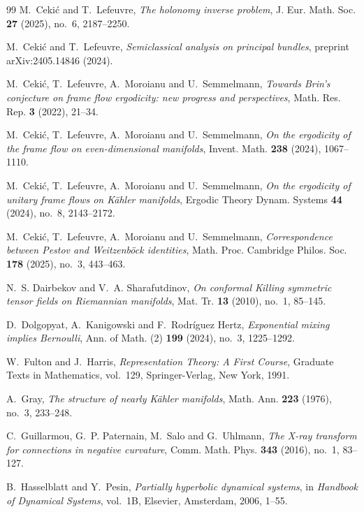 \documentclass[reqno,11pt]{amsart}
\theoremstyle{definition}
\begin{document}
\begin{thebibliography}{99}
M.~Ceki\'c and T.~Lefeuvre,
\emph{The holonomy inverse problem},
J. Eur. Math. Soc. \textbf{27} (2025), no.~6, 2187--2250.

M.~Ceki\'c and T.~Lefeuvre,
\emph{Semiclassical analysis on principal bundles},
preprint arXiv:2405.14846 (2024).

M.~Ceki\'c, T.~Lefeuvre, A.~Moroianu and U.~Semmelmann,
\emph{Towards Brin's conjecture on frame flow ergodicity: new progress and
perspectives},
Math. Res. Rep. \textbf{3} (2022), 21--34.

M.~Ceki\'c, T.~Lefeuvre, A.~Moroianu and U.~Semmelmann,
\emph{On the ergodicity of the frame flow on even-dimensional manifolds},
Invent. Math. \textbf{238} (2024), 1067--1110.

M.~Ceki\'c, T.~Lefeuvre, A.~Moroianu and U.~Semmelmann,
\emph{On the ergodicity of unitary frame flows on K\"ahler manifolds},
Ergodic Theory Dynam. Systems \textbf{44} (2024), no.~8, 2143--2172.

M.~Ceki\'c, T.~Lefeuvre, A.~Moroianu and U.~Semmelmann,
\emph{Correspondence between Pestov and Weitzenb\"ock identities},
Math. Proc. Cambridge Philos. Soc. \textbf{178} (2025), no.~3, 443--463.

N.~S. Dairbekov and V.~A. Sharafutdinov,
\emph{On conformal Killing symmetric tensor fields on Riemannian manifolds},
Mat. Tr. \textbf{13} (2010), no.~1, 85--145.

D.~Dolgopyat, A.~Kanigowski and F.~Rodr\'iguez Hertz,
\emph{Exponential mixing implies Bernoulli},
Ann. of Math. (2) \textbf{199} (2024), no.~3, 1225--1292.

W.~Fulton and J.~Harris,
\emph{Representation Theory: A First Course},
Graduate Texts in Mathematics, vol.~129, Springer-Verlag, New York, 1991.

A.~Gray,
\emph{The structure of nearly K\"ahler manifolds},
Math. Ann. \textbf{223} (1976), no.~3, 233--248.

C.~Guillarmou, G.~P. Paternain, M.~Salo and G.~Uhlmann,
\emph{The X-ray transform for connections in negative curvature},
Comm. Math. Phys. \textbf{343} (2016), no.~1, 83--127.

B.~Hasselblatt and Y.~Pesin,
\emph{Partially hyperbolic dynamical systems},
in \emph{Handbook of Dynamical Systems}, vol.~1B,
Elsevier, Amsterdam, 2006, 1--55.


\end{thebibliography}
\end{document}
